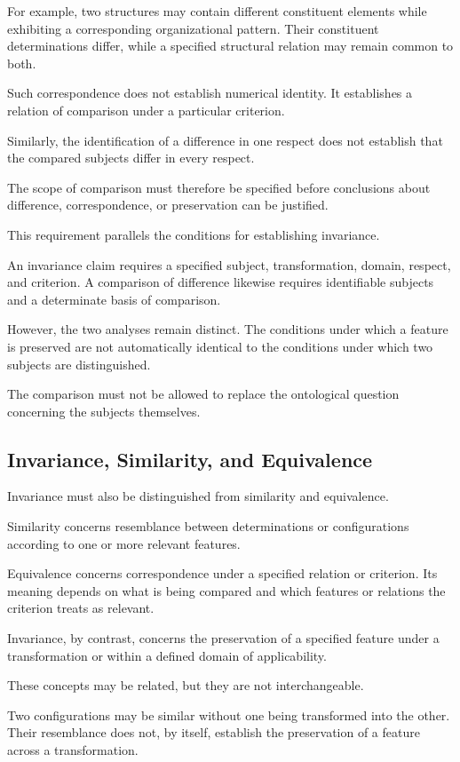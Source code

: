For example, two structures may contain
different constituent elements while
exhibiting a corresponding organizational
pattern. Their constituent determinations
differ, while a specified structural
relation may remain common to both.

Such correspondence does not establish
numerical identity. It establishes a
relation of comparison under a particular
criterion.

Similarly, the identification of a
difference in one respect does not
establish that the compared subjects
differ in every respect.

The scope of comparison must therefore
be specified before conclusions about
difference, correspondence, or preservation
can be justified.

This requirement parallels the conditions
for establishing invariance.

An invariance claim requires a specified
subject, transformation, domain, respect,
and criterion. A comparison of difference
likewise requires identifiable subjects
and a determinate basis of comparison.

However, the two analyses remain distinct.
The conditions under which a feature is
preserved are not automatically identical
to the conditions under which two subjects
are distinguished.

The comparison must not be allowed to
replace the ontological question concerning
the subjects themselves.

\subsection{Invariance, Similarity, and Equivalence}

Invariance must also be distinguished
from similarity and equivalence.

Similarity concerns resemblance between
determinations or configurations according
to one or more relevant features.

Equivalence concerns correspondence under
a specified relation or criterion. Its
meaning depends on what is being compared
and which features or relations the
criterion treats as relevant.

Invariance, by contrast, concerns the
preservation of a specified feature under
a transformation or within a defined
domain of applicability.

These concepts may be related, but they
are not interchangeable.

Two configurations may be similar without
one being transformed into the other.
Their resemblance does not, by itself,
establish the preservation of a feature
across a transformation.

